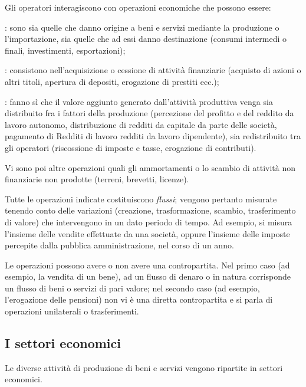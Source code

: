 Gli operatori interagiscono con operazioni economiche che possono 
essere:
\begin{description} [noitemsep]
 \item [operazioni su beni e servizi]: sono sia quelle che danno origine a beni 
e servizi mediante la produzione o l'importazione, sia quelle che ad essi 
danno destinazione (consumi intermedi o finali, 
investimenti, esportazioni);
\item [operazioni finanziarie]: consistono nell'acquisizione o cessione di 
attività finanziarie (acquisto di azioni o altri 
titoli, apertura di depositi, erogazione di prestiti ecc.);
\item [operazioni di distribuzione e redistribuzione del reddito e della 
ricchezza]: 
fanno sì che il valore aggiunto generato dall'attività produttiva venga sia 
distribuito fra i fattori della produzione (percezione del profitto e 
del reddito da lavoro autonomo, distribuzione di redditi da 
capitale da parte delle società, pagamento di Redditi di lavoro 
redditi da lavoro dipendente), sia redistribuito tra gli operatori 
(riscossione di imposte e tasse, erogazione di contributi).
\end{description}

Vi sono poi altre operazioni quali gli ammortamenti o lo 
scambio di attività non finanziarie non prodotte (terreni, brevetti, licenze).

Tutte le operazioni indicate costituiscono \emph{flussi}; vengono pertanto 
misurate tenendo conto delle variazioni (creazione, trasformazione, scambio, 
trasferimento di valore) che intervengono in un dato periodo di tempo. Ad 
esempio, si misura l'insieme delle vendite effettuate da una società, oppure 
l'insieme delle imposte percepite dalla pubblica amministrazione, nel corso di 
un anno.

Le operazioni possono avere o non avere una contropartita. Nel primo caso (ad 
esempio, la vendita di un bene), ad un flusso di denaro o in natura corrisponde 
un flusso di beni o servizi di pari valore; nel secondo caso (ad esempio, 
l'erogazione delle pensioni) non vi è una diretta contropartita e si parla 
di operazioni unilaterali o trasferimenti.

\subsection{I settori economici}

Le diverse attività di produzione di beni e servizi vengono ripartite in 
settori economici.

